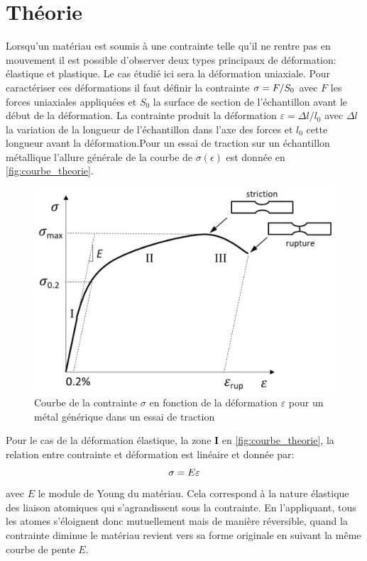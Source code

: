\section{Théorie}
Lorsqu'un matériau est soumis à une contrainte telle qu'il ne rentre pas en mouvement il est possible d'observer deux types principaux de déformation: élastique et plastique. Le cas étudié ici sera la déformation uniaxiale. Pour caractériser ces déformations il faut définir la contrainte $\sigma = F/S_0$ avec $F$ les forces uniaxiales appliquées et $S_0$ la surface de section de l'échantillon avant le début de la déformation. La contrainte produit la déformation $\varepsilon = \Delta l / l_0$ avec $\Delta l$ la variation de la longueur de l'échantillon dans l'axe des forces et $l_0$ cette longueur avant la déformation.Pour un essai de traction sur un échantillon métallique l'allure générale de la courbe de $\sigma(\epsilon)$ est donnée en \autoref{fig:courbe_theorie}.
\begin{figure}[h]
    \centering
    \includegraphics[width=0.6\linewidth]{figures/courbe_traction.png}
    \caption{Courbe de la contrainte $\sigma$ en fonction de la déformation $\varepsilon$ pour un métal générique dans un essai de traction \cite{notice}}
    \label{fig:courbe_theorie}
\end{figure}

Pour le cas de la déformation élastique, la zone $\mathbf{I}$ en \autoref{fig:courbe_theorie}, la relation entre contrainte et déformation est linéaire et donnée par:
\begin{equation}
    \sigma = E \varepsilon
\end{equation}
avec $E$ le module de Young du matériau. Cela correspond à la nature élastique des liaison atomiques qui s'agrandissent sous la contrainte. En l'appliquant, tous les atomes s'éloignent donc mutuellement mais de manière réversible, quand la contrainte diminue le matériau revient vers sa forme originale en suivant la même courbe de pente $E$.

